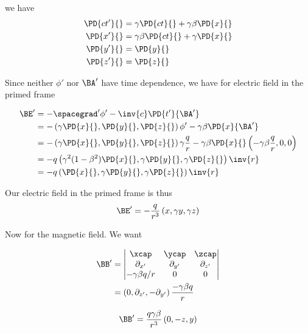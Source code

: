we have
\begin{align}\label{eqn:relElectroDynProblemSet2:1050}
\PD{c t'}{} &= \gamma \PD{ct}{} + \gamma \beta \PD{x}{} \\
\PD{x'}{} &= \gamma \beta \PD{ct}{} + \gamma \PD{x}{} \\
\PD{y'}{} &= \PD{y}{} \\
\PD{z'}{} &= \PD{z}{}
\end{align}

Since neither $\phi'$ nor $\BA'$ have time dependence, we have for electric field in the primed frame

\begin{align*}
\BE' 
&= -\spacegrad' \phi' - \inv{c} \PD{t'}{\BA'} \\
&= 
-\left( \gamma \PD{x}{}, \PD{y}{}, \PD{z}{} \right) \phi'
- \gamma \beta \PD{x}{\BA'} \\
&= 
-\left( \gamma \PD{x}{}, \PD{y}{}, \PD{z}{} \right) \gamma \frac{q}{r}
- \gamma \beta \PD{x}{} \left( -\gamma \beta \frac{q}{r}, 0, 0 \right) \\
&= -q \left( \gamma^2 ( 1 - \beta^2 ) \PD{x}{}, \gamma \PD{y}{}, \gamma \PD{z}{} \right) \inv{r} \\
&= -q \left( \PD{x}{}, \gamma \PD{y}{}, \gamma \PD{z}{} \right) \inv{r}
\end{align*}

Our electric field in the primed frame is thus
\begin{equation}\label{eqn:relElectroDynProblemSet2:1070}
\BE' = -\frac{q}{r^3} \left( x, \gamma y, \gamma z \right) 
\end{equation}

Now for the magnetic field.  We want

\begin{align*}
\BB' 
&= 
\begin{vmatrix}
\xcap & \ycap & \zcap \\
\partial_{x'} & \partial_{y'} & \partial_{z'} \\
-\gamma \beta q/r & 0 & 0
\end{vmatrix} \\
&=
\left( 0, \partial_{z'}, -\partial_{y'} \right) \frac{-\gamma \beta q}{r} \\
\end{align*}

\begin{equation}\label{eqn:relElectroDynProblemSet2:1090}
\BB'
=
\frac{q \gamma \beta}{r^3} \left( 0, -z, y \right)
\end{equation}

